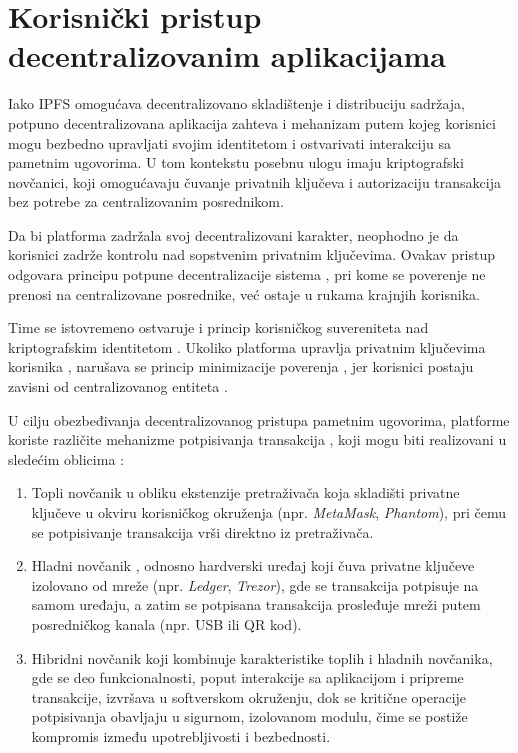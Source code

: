 \section{Korisnički pristup decentralizovanim aplikacijama}
Iako IPFS omogućava decentralizovano skladištenje i distribuciju sadržaja, potpuno decentralizovana aplikacija zahteva i mehanizam putem kojeg korisnici mogu bezbedno upravljati svojim identitetom i ostvarivati interakciju sa pametnim ugovorima. U tom kontekstu posebnu ulogu imaju kriptografski novčanici, koji omogućavaju čuvanje privatnih ključeva i autorizaciju transakcija bez potrebe za centralizovanim posrednikom.

Da bi platforma zadržala svoj decentralizovani karakter, neophodno je da korisnici zadrže kontrolu nad sopstvenim privatnim ključevima. Ovakav pristup odgovara principu potpune decentralizacije sistema , pri kome se poverenje ne prenosi na centralizovane posrednike, već ostaje u rukama krajnjih korisnika.

Time se istovremeno ostvaruje i princip korisničkog suvereniteta nad kriptografskim identitetom . Ukoliko platforma upravlja privatnim ključevima korisnika , narušava se princip minimizacije poverenja , jer korisnici postaju zavisni od centralizovanog entiteta \cite{levitin2022not}.

U cilju obezbeđivanja decentralizovanog pristupa pametnim ugovorima, platforme koriste različite mehanizme potpisivanja transakcija , koji mogu biti realizovani u sledećim oblicima \cite{syed2025systematic}:

\begin{enumerate}
\item Topli novčanik  u obliku ekstenzije pretraživača koja skladišti privatne ključeve u okviru korisničkog okruženja (npr. \textit{MetaMask}, \textit{Phantom}), pri čemu se potpisivanje transakcija vrši direktno iz pretraživača.

\item Hladni novčanik , odnosno hardverski uređaj koji čuva privatne ključeve izolovano od mreže (npr. \textit{Ledger}, \textit{Trezor}), gde se transakcija potpisuje na samom uređaju, a zatim se potpisana transakcija prosleđuje mreži putem posredničkog kanala (npr. USB ili QR kod).

\item Hibridni novčanik  koji kombinuje karakteristike toplih i hladnih novčanika, gde se deo funkcionalnosti, poput interakcije sa aplikacijom i pripreme transakcije, izvršava u softverskom okruženju, dok se kritične operacije potpisivanja obavljaju u sigurnom, izolovanom modulu, čime se postiže kompromis između upotrebljivosti i bezbednosti.
\end{enumerate}

